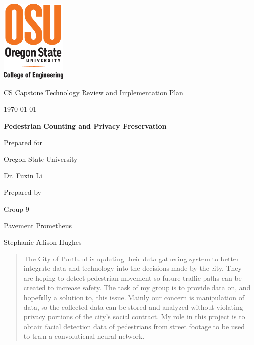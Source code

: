 \documentclass[onecolumn, draftclsnofoot,10pt, compsoc]{IEEEtran}
\def \CapstoneTeamName{		Pavement Prometheus}
\def \CapstoneTeamNumber{		9}
\def \GroupMemberOne{		Stephanie Allison Hughes }
\def \CapstoneProjectName{		Pedestrian Counting and Privacy Preservation}
\def \CapstoneSponsorCompany{	Oregon State University}
\def \CapstoneSponsorPerson{		Dr. Fuxin Li}
\def \DocType{		%
				Technology Review and Implementation Plan
				}
\newcommand{\NameSigPair}[1]{\par
\makebox[2.75in][r]{#1} \hfil 	\makebox[3.25in]{\makebox[2.25in]{\hrulefill} \hfill		\makebox[.75in]{\hrulefill}}
\par\vspace{-12pt} \textit{\tiny\noindent
\makebox[2.75in]{} \hfil		\makebox[3.25in]{\makebox[2.25in][r]{Signature} \hfill	\makebox[.75in][r]{Date}}}}
\renewcommand{\NameSigPair}[1]{#1}
\begin{document}
\begin{titlepage}
    \begin{singlespace}
    	\includegraphics[height=4cm]{coe_v_spot1}
        \hfill 
        \par\vspace{.2in}
        \centering
        \scshape{
            \huge CS Capstone \DocType \par
            {\large\today}\par
            \vspace{.5in}
            \textbf{\Huge\CapstoneProjectName}\par
            {\large Prepared for}\par
            \Huge \CapstoneSponsorCompany\par
            \vspace{5pt}
            {\Large\NameSigPair{\CapstoneSponsorPerson}\par}
            {\large Prepared by }\par
            Group\CapstoneTeamNumber\par
            \CapstoneTeamName\par 
            \vspace{5pt}
            {\Large
                \NameSigPair{\GroupMemberOne}\par
            }
            \vspace{20pt}
        }
        \begin{abstract}
        The City of Portland is updating their data gathering system to better integrate data and technology into the decisions made by the city. They are hoping to detect pedestrian movement so future traffic paths can be created to increase safety. The task of my group is to provide data on, and hopefully a solution to, this issue. Mainly our concern is manipulation of data, so the collected data can be stored and analyzed without violating privacy portions of the city's social contract. My role in this project is to obtain facial detection data of pedestrians from street footage to be used to train a convolutional neural network. 
        \end{abstract}     
    \end{singlespace}
\end{titlepage}
\newpage
{}
\tableofcontents
\clearpage
\end{document}
